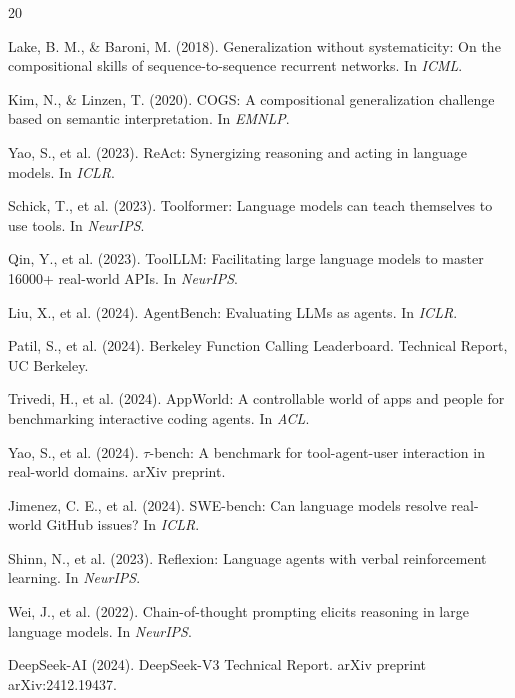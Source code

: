 \documentclass[10pt]{article}
\begin{document}

\begin{thebibliography}{20}

Lake, B. M., \& Baroni, M. (2018).
\newblock Generalization without systematicity: On the compositional skills of sequence-to-sequence recurrent networks.
\newblock In {\em ICML}.

Kim, N., \& Linzen, T. (2020).
\newblock COGS: A compositional generalization challenge based on semantic interpretation.
\newblock In {\em EMNLP}.

Yao, S., et al. (2023).
\newblock ReAct: Synergizing reasoning and acting in language models.
\newblock In {\em ICLR}.

Schick, T., et al. (2023).
\newblock Toolformer: Language models can teach themselves to use tools.
\newblock In {\em NeurIPS}.

Qin, Y., et al. (2023).
\newblock ToolLLM: Facilitating large language models to master 16000+ real-world APIs.
\newblock In {\em NeurIPS}.

Liu, X., et al. (2024).
\newblock AgentBench: Evaluating LLMs as agents.
\newblock In {\em ICLR}.

Patil, S., et al. (2024).
\newblock Berkeley Function Calling Leaderboard.
\newblock Technical Report, UC Berkeley.

Trivedi, H., et al. (2024).
\newblock AppWorld: A controllable world of apps and people for benchmarking interactive coding agents.
\newblock In {\em ACL}.

Yao, S., et al. (2024).
\newblock $\tau$-bench: A benchmark for tool-agent-user interaction in real-world domains.
\newblock arXiv preprint.

Jimenez, C. E., et al. (2024).
\newblock SWE-bench: Can language models resolve real-world GitHub issues?
\newblock In {\em ICLR}.

Shinn, N., et al. (2023).
\newblock Reflexion: Language agents with verbal reinforcement learning.
\newblock In {\em NeurIPS}.

Wei, J., et al. (2022).
\newblock Chain-of-thought prompting elicits reasoning in large language models.
\newblock In {\em NeurIPS}.

DeepSeek-AI (2024).
\newblock DeepSeek-V3 Technical Report.
\newblock arXiv preprint arXiv:2412.19437.

\end{thebibliography}
\end{document}

